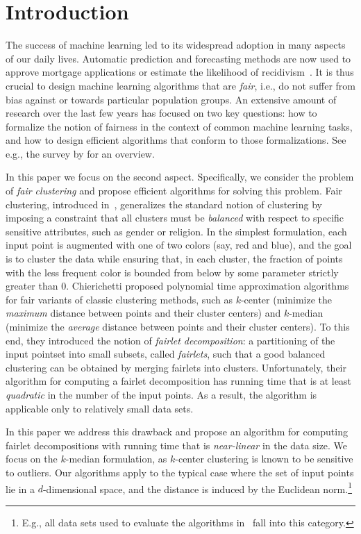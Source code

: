 \section{Introduction}

The success of machine learning led to its widespread adoption in many aspects of our daily lives. Automatic prediction and forecasting methods are now used to approve mortgage applications or estimate the likelihood of recidivism~\citep{chouldechova2017fair}. It is thus crucial to design machine learning algorithms that are {\em fair}, i.e., do not suffer from bias against or towards particular population groups. An extensive amount of research over the last few  years has focused on two key questions: how to formalize the notion of fairness in the context of common machine learning tasks, and how to design efficient algorithms that conform to those formalizations. See e.g., the survey by \cite{chouldechova2018frontiers} for an overview.

In this paper we focus on the second aspect. Specifically, we consider the problem of {\em fair clustering} and propose efficient algorithms for solving this problem. Fair clustering, introduced in~\citep{chierichetti2017fair}, generalizes the standard notion of clustering by imposing a constraint that all clusters must be {\em balanced} with respect to specific sensitive attributes, such as gender or religion. In the simplest formulation, each input point is augmented  with one of two colors (say, red and blue), and the goal is to cluster the data while ensuring that, in each cluster, the fraction of points with the less frequent color is bounded from below by some parameter strictly greater than $0$. Chierichetti \etal proposed polynomial time approximation algorithms for fair variants of classic clustering methods, such as $k$-center (minimize the {\em maximum} distance between points and their cluster centers) and $k$-median (minimize the {\em average} distance between points and their cluster centers). To this end, they introduced the notion of {\em fairlet decomposition}: a partitioning of the input pointset into small subsets, called {\em fairlets}, such that a good balanced clustering can be obtained by merging fairlets into clusters. Unfortunately, their algorithm for computing a fairlet decomposition has running time that is at least {\em quadratic} in the number of the input points. As a result, the algorithm is applicable only to relatively small data sets.

In this paper we address this drawback and propose an algorithm for computing fairlet decompositions with running time that  is {\em near-linear} in the data size. We focus on the $k$-median formulation, as $k$-center clustering is known to be sensitive to outliers. Our algorithms apply to the typical case where the set of input points lie in a $d$-dimensional space, and the distance is induced by the Euclidean norm.\footnote{E.g., all data sets used to evaluate the algorithms in~\citep{chierichetti2017fair} fall into this category.}


